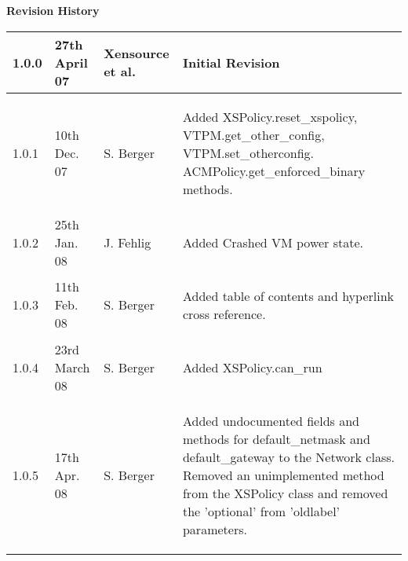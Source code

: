 { \bf Revision History}

\begin{center}
 \begin{tabular}{|l|l|l|l|}
  \hline
  1.0.0 & 27th April 07 & Xensource et al. &
   \begin{minipage}[t][.7cm]{7cm}
     Initial Revision
   \end{minipage}\\
  \hline
  1.0.1 & 10th Dec. 07 & S. Berger &
   \begin{minipage}[t]{7cm}
    \begin{flushleft}
     Added XSPolicy.reset\_xspolicy, VTPM.get\_other\_config,
     VTPM.set\_otherconfig. ACMPolicy.get\_enforced\_binary methods.
    \end{flushleft}
   \end{minipage}\\
  \hline
  1.0.2 & 25th Jan. 08 & J. Fehlig &
   \begin{minipage}[t]{7cm}
    \begin{flushleft}
     Added Crashed VM power state.
    \end{flushleft}
   \end{minipage}\\
  \hline
  1.0.3 & 11th Feb. 08 & S. Berger &
   \begin{minipage}[t]{7cm}
    \begin{flushleft}
     Added table of contents and hyperlink cross reference.
    \end{flushleft}
   \end{minipage}\\
  \hline
  1.0.4 & 23rd March 08 & S. Berger &
   \begin{minipage}[t]{7cm}
    \begin{flushleft}
     Added XSPolicy.can\_run
    \end{flushleft}
   \end{minipage}\\
  \hline
  1.0.5 & 17th Apr. 08 & S. Berger &
   \begin{minipage}[t]{7cm}
    \begin{flushleft}
     Added undocumented fields and methods for default\_netmask and
     default\_gateway to the Network class. Removed an unimplemented
     method from the XSPolicy class and removed the 'optional' from
     'oldlabel' parameters.
    \end{flushleft}
   \end{minipage}\\
  \hline
 \end{tabular}
\end{center}
